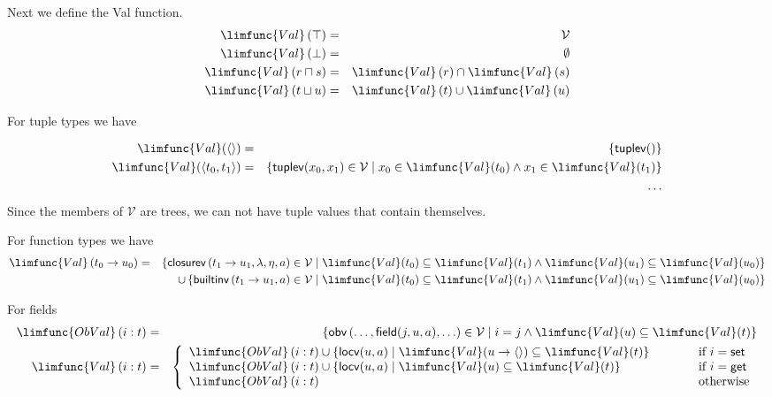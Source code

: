 \documentclass[12pt]{article}
\begin{document}
Next we define the Val function.%
\begin{eqnarray*}
\limfunc{Val}\left( \top \right) &=&\mathcal{V} \\
\limfunc{Val}\left( \bot \right) &=&\emptyset \\
\limfunc{Val}\left( r\sqcap s\right) &=&\limfunc{Val}\left( r\right) \cap 
\limfunc{Val}\left( s\right) \\
\limfunc{Val}\left( t\sqcup u\right) &=&\limfunc{Val}\left( t\right) \cup 
\limfunc{Val}\left( u\right)
\end{eqnarray*}

For tuple types we have

\begin{eqnarray*}
\limfunc{Val}(\left\langle {}\right\rangle ) &=&\left\{ \mathsf{tuplev()}%
\right\} \\
\limfunc{Val}(\left\langle t_{0},t_{1}\right\rangle ) &=&\left\{ \mathsf{%
tuplev}(x_{0},x_{1})\in \mathcal{V}\mid x_{0}\in \limfunc{Val}(t_{0})\wedge
x_{1}\in \limfunc{Val}(t_{1})\right\} \\
&&\ldots
\end{eqnarray*}%
Since the members of $\mathcal{V}$ are trees, we can not have tuple values
that contain themselves.

For function types we have%
\begin{eqnarray*}
\limfunc{Val}\left( t_{0}\rightarrow u_{0}\right) &=&\left\{ \mathsf{closurev%
}\left( t_{1}\rightarrow u_{1},\lambda ,\eta ,a\right) \in \mathcal{V}\mid 
\limfunc{Val}(t_{0})\subseteq \limfunc{Val}(t_{1})\wedge \limfunc{Val}%
(u_{1})\subseteq \limfunc{Val}(u_{0})\right\} \\
&&\cup \left\{ \mathsf{builtinv}\left( t_{1}\rightarrow u_{1},a\right) \in 
\mathcal{V}\mid \limfunc{Val}(t_{0})\subseteq \limfunc{Val}(t_{1})\wedge 
\limfunc{Val}(u_{1})\subseteq \limfunc{Val}(u_{0})\right\}
\end{eqnarray*}

For fields%
\begin{eqnarray*}
\limfunc{ObVal}\left( i:t\right) &=&\left\{ \mathsf{obv}\left( \ldots ,%
\mathsf{field}(j,u,a),\ldots \right) \in \mathcal{V}\mid i=j\wedge \limfunc{%
Val}(u)\subseteq \limfunc{Val}(t)\right\} \\
\limfunc{Val}\left( i:t\right) &=&\left\{ 
\begin{array}{lll}
\limfunc{ObVal}\left( i:t\right) \cup \left\{ \mathsf{locv}(u,a)\mid 
\limfunc{Val}(u\rightarrow \left\langle {}\right\rangle )\subseteq \limfunc{%
Val}(t)\right\} & \qquad & \text{if }i=\mathsf{set} \\ 
\limfunc{ObVal}\left( i:t\right) \cup \left\{ \mathsf{locv}(u,a)\mid 
\limfunc{Val}(u)\subseteq \limfunc{Val}(t)\right\} &  & \text{if }i=\mathsf{%
get} \\ 
\limfunc{ObVal}\left( i:t\right) &  & \text{otherwise}%
\end{array}%
\right.
\end{eqnarray*}
\end{document}
